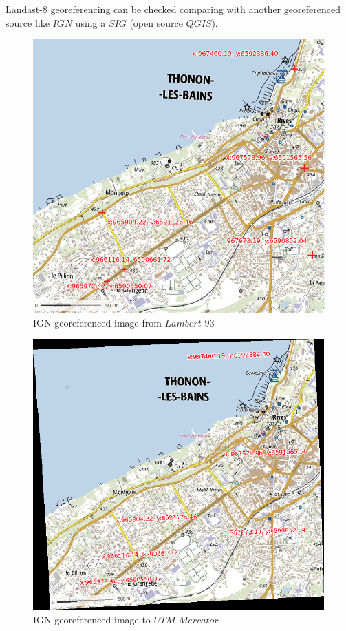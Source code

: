 \documentclass{beamer}
\begin{document}
\begin{frame}
Landast-8 georeferencing can be checked comparing with another georeferenced source like $IGN$ using a $SIG$ (open source $QGIS$).\\
\centering
\begin{minipage}{.5\textwidth}
    \centering
    \begin{figure}
        \includegraphics[scale=0.13]{images/georeferencing/ign-points-Thonon.png}
        \caption{IGN georeferenced image from $Lambert$ $93$ }
    \end{figure}
\end{minipage}%
\begin{minipage}{.5\textwidth}
    \centering
    \begin{figure}
        \includegraphics[scale=0.09]{images/georeferencing/qgis-resultat.png}
        \caption{IGN georeferenced image to $UTM$ $Mercator$}
    \end{figure}
\end{minipage}


\end{frame}
\end{document}
